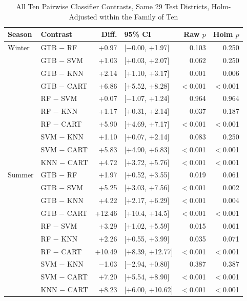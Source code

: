 \documentclass[conference]{IEEEtran}
\begin{document}
\begin{table}[!htbp]
\caption{All Ten Pairwise Classifier Contrasts, Same 29 Test Districts, Holm-Adjusted within the Family of Ten}
\label{tab_pairwise_all}
\begin{center}
\setlength{\tabcolsep}{2pt}
\footnotesize
\begin{tabular}{@{}llrlrr@{}}
\toprule
\textbf{Season} & \textbf{Contrast} & \textbf{Diff.} & \textbf{95\% CI} & \textbf{Raw $p$} & \textbf{Holm $p$} \\
\midrule
Winter & GTB $-$ RF   & +0.97 & [$-$0.00, +1.97] & 0.103 & 0.250 \\
       & GTB $-$ SVM  & +1.03 & [+0.03, +2.07]   & 0.062 & 0.250 \\
       & GTB $-$ KNN  & +2.14 & [+1.10, +3.17]   & 0.001 & 0.006 \\
       & GTB $-$ CART & +6.86 & [+5.52, +8.28]   & $<$0.001 & $<$0.001 \\
       & RF $-$ SVM   & +0.07 & [$-$1.07, +1.24] & 0.964 & 0.964 \\
       & RF $-$ KNN   & +1.17 & [+0.31, +2.14]   & 0.037 & 0.187 \\
       & RF $-$ CART  & +5.90 & [+4.69, +7.17]   & $<$0.001 & $<$0.001 \\
       & SVM $-$ KNN  & +1.10 & [+0.07, +2.14]   & 0.083 & 0.250 \\
       & SVM $-$ CART & +5.83 & [+4.90, +6.83]   & $<$0.001 & $<$0.001 \\
       & KNN $-$ CART & +4.72 & [+3.72, +5.76]   & $<$0.001 & $<$0.001 \\
\midrule
Summer & GTB $-$ RF   & +1.97 & [+0.52, +3.55]   & 0.019 & 0.061 \\
       & GTB $-$ SVM  & +5.25 & [+3.03, +7.56]   & $<$0.001 & 0.002 \\
       & GTB $-$ KNN  & +4.22 & [+2.17, +6.29]   & $<$0.001 & 0.004 \\
       & GTB $-$ CART & +12.46 & [+10.4, +14.5]  & $<$0.001 & $<$0.001 \\
       & RF $-$ SVM   & +3.29 & [+1.02, +5.59]   & 0.015 & 0.061 \\
       & RF $-$ KNN   & +2.26 & [+0.55, +3.99]   & 0.035 & 0.071 \\
       & RF $-$ CART  & +10.49 & [+8.39, +12.77] & $<$0.001 & $<$0.001 \\
       & SVM $-$ KNN  & $-$1.03 & [$-$2.94, +0.80] & 0.387 & 0.387 \\
       & SVM $-$ CART & +7.20 & [+5.54, +8.90]   & $<$0.001 & $<$0.001 \\
       & KNN $-$ CART & +8.23 & [+6.00, +10.62]  & $<$0.001 & $<$0.001 \\
\bottomrule
\end{tabular}


\end{center}
\end{table}
\end{document}
